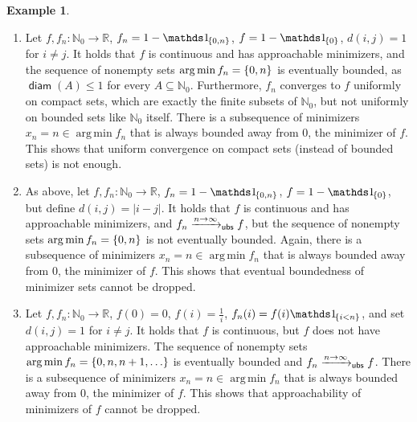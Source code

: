 \documentclass{scrartcl}
\renewcommand{\subset}{\subseteq}
\DeclareMathOperator{\diam}{\mathsf{diam}}
\newcommand{\N}{\mathbb{N}}
\newcommand{\R}{\mathbb{R}}
\DeclareMathOperator*{\argmin}{arg\,min}
\theoremstyle{plain}\newtheorem{theorem}{Theorem}[section]
\theoremstyle{definition}
\newtheorem{example}[theorem]{Example}
\theoremstyle{remark}
\begin{document}
\begin{appendix}
\begin{example}\label{exa:alt:necessary}
\mbox{ }
\begin{enumerate}[label=(\roman*)]
	\item 
	Let $f,f_n\colon \N_0 \to \R$, $f_n = 1-\indOf{\cb{0,n}}$, $f = 1-\indOf{\cb{0}}$, $d(i,j) = 1$ for $i\neq j$.
	It holds that $f$ is continuous and has approachable minimizers, and the sequence of nonempty sets $\argmin f_n = \cb{0,n}$ is eventually bounded, as $\diam(A)\leq1$ for every $A\subset\N_0$. Furthermore, $f_n$ converges to $f$ uniformly on compact sets, which are exactly the finite subsets of $\N_0$, but not uniformly on bounded sets like $\N_0$ itself.
	There is a subsequence of minimizers $x_n=n\in \argmin f_n$ that is always bounded away from $0$, the minimizer of $f$.
	This shows that uniform convergence on compact sets (instead of bounded sets) is not enough.
	\item
	As above, let $f, f_n\colon \N_0 \to \R$, $f_n = 1-\indOf{\cb{0,n}}$, $f = 1-\indOf{\cb{0}}$, but define $d(i,j) = |i-j|$.
	It holds that $f$ is continuous and has approachable minimizers, and $f_n\xrightarrow{n\to\infty}_{\mathsf{ubs}} f$, but the sequence of nonempty sets $\argmin f_n = \cb{0,n}$ is not eventually bounded. 
	Again, there is a subsequence of minimizers $x_n=n\in \argmin f_n$ that is always bounded away from $0$, the minimizer of $f$.
	This shows that eventual boundedness of minimizer sets cannot be dropped.
	\item
	Let $f,f_n\colon \N_0 \to \R$, $f(0) = 0$, $f(i) = \frac{1}i$, $f_n(i) = f(i)\indOfEvent{i < n}$, and set $d(i,j) = 1$  for $i\neq j$.
	It holds that $f$ is continuous, but $f$ does not have approachable minimizers. The sequence of nonempty sets $\argmin f_n = \cb{0,n, n+1, \dots}$ is eventually bounded and $f_n\xrightarrow{n\to\infty}_{\mathsf{ubs}} f$.
	There is a subsequence of minimizers $x_n=n\in \argmin f_n$ that is always bounded away from $0$, the minimizer of $f$.
	This shows that approachability of minimizers of $f$ cannot be dropped.
\end{enumerate}
\end{example}

\end{appendix}
\end{document}
